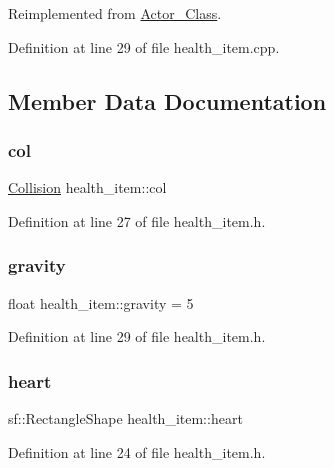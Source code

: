 Reimplemented from \hyperlink{class_actor___class_af1764a94c5410ba8476f56553cd2c327}{Actor\+\_\+\+Class}.



Definition at line 29 of file health\+\_\+item.\+cpp.



\subsection{Member Data Documentation}
\hypertarget{classhealth__item_a9abffa822bf114c7a57f8516deefeb57}{}\label{classhealth__item_a9abffa822bf114c7a57f8516deefeb57} 
\subsubsection{\texorpdfstring{col}{col}}
{\footnotesize\ttfamily \hyperlink{class_collision}{Collision} health\+\_\+item\+::col}



Definition at line 27 of file health\+\_\+item.\+h.

\hypertarget{classhealth__item_af36b663f6a9950d15be362d964bdde40}{}\label{classhealth__item_af36b663f6a9950d15be362d964bdde40} 
\subsubsection{\texorpdfstring{gravity}{gravity}}
{\footnotesize\ttfamily float health\+\_\+item\+::gravity = 5}



Definition at line 29 of file health\+\_\+item.\+h.

\hypertarget{classhealth__item_a199636ed174bbbca7fee42dffbc3fd86}{}\label{classhealth__item_a199636ed174bbbca7fee42dffbc3fd86} 
\subsubsection{\texorpdfstring{heart}{heart}}
{\footnotesize\ttfamily sf\+::\+Rectangle\+Shape health\+\_\+item\+::heart}



Definition at line 24 of file health\+\_\+item.\+h.

